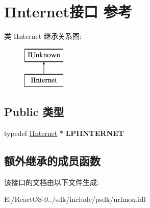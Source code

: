 \hypertarget{interface_i_internet}{}\section{I\+Internet接口 参考}
\label{interface_i_internet}
类 I\+Internet 继承关系图\+:\begin{figure}[H]
\begin{center}
\leavevmode
\includegraphics[height=2.000000cm]{interface_i_internet}
\end{center}
\end{figure}
\subsection*{Public 类型}
\begin{DoxyCompactItemize}
\item 
\mbox{\label{interface_i_internet_a20fd06a1097e39b30b5de0eb21c654a0}} 
typedef \hyperlink{interface_i_internet}{I\+Internet} $\ast$ {\bfseries L\+P\+I\+I\+N\+T\+E\+R\+N\+ET}
\end{DoxyCompactItemize}
\subsection*{额外继承的成员函数}


该接口的文档由以下文件生成\+:\begin{DoxyCompactItemize}
\item 
E\+:/\+React\+O\+S-\/0../sdk/include/psdk/urlmon.\+idl\end{DoxyCompactItemize}
